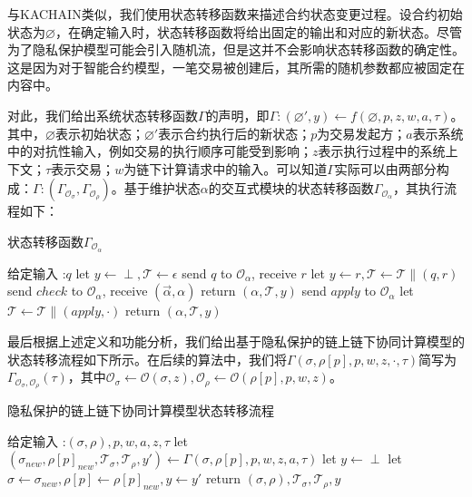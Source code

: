 与KACHAIN\cite{9505181}类似，我们使用状态转移函数来描述合约状态变更过程。设合约初始状态为$\varnothing$，在确定输入时，状态转移函数将给出固定的输出和对应的新状态。尽管为了隐私保护模型可能会引入随机流，但是这并不会影响状态转移函数的确定性。这是因为对于智能合约模型，一笔交易被创建后，其所需的随机参数都应被固定在内容中。

对此，我们给出系统状态转移函数$\Gamma$的声明，即$\Gamma:(\varnothing', y) \leftarrow f(\varnothing, p, z, w, a, \tau)$。其中，$\varnothing$表示初始状态；$\varnothing'$表示合约执行后的新状态；$p$为交易发起方；$a$表示系统中的对抗性输入，例如交易的执行顺序可能受到影响；$z$表示执行过程中的系统上下文；$\tau$表示交易；$w$为链下计算请求中的输入。可以知道$\Gamma$实际可以由两部分构成：$\Gamma: (\Gamma_{\mathcal{O}_\sigma}, \Gamma_{\mathcal{O}_\rho})$。基于维护状态$\alpha$的交互式模块的状态转移函数$\Gamma_{\mathcal{O}_\alpha}$，其执行流程如下：

\begin{breakablealgorithm}
    \caption{状态转移函数$\Gamma_{\mathcal{O}_\alpha}$}
    \label{alg:ch3-3}
    \begin{algorithmic} 
        \item[给定输入]:$q$
        \STATE let $y \leftarrow \perp, \mathcal{T} \leftarrow \epsilon$
        \STATE send $q$ to $\mathcal{O}_\alpha$, receive $r$
        \STATE let $y \leftarrow r, \mathcal{T} \leftarrow \mathcal{T} \parallel (q, r)$
        \STATE send $check$ to $\mathcal{O}_\alpha$, receive $(\vec{\alpha}, \alpha)$
        \STATE return $(\alpha, \mathcal{T}, y)$
        \ENDIF
        \STATE send $apply$ to $\mathcal{O}_\alpha$
        \STATE let $\mathcal{T} \leftarrow \mathcal{T} \parallel (apply, \cdot)$
        \STATE return $(\alpha, \mathcal{T}, y)$
    \end{algorithmic}
\end{breakablealgorithm}

最后根据上述定义和功能分析，我们给出基于隐私保护的链上链下协同计算模型的状态转移流程如下所示。在后续的算法中，我们将$\Gamma(\sigma, \rho[p], p, w, z, \cdot, \tau)$简写为$\Gamma_{\mathcal{O}_\sigma, \mathcal{O}_\rho}(\tau)$，其中$\mathcal{O}_\sigma \leftarrow \mathcal{O}(\sigma, z), \mathcal{O}_\rho \leftarrow \mathcal{O}(\rho[p], p, w, z)$。

\begin{breakablealgorithm}
    \caption{隐私保护的链上链下协同计算模型状态转移流程}
    \label{alg:ch3-4}
    \begin{algorithmic} 
        \setlength{\itemsep}{0pt}
        \setlength{\parsep}{0pt}
        \setlength{\parskip}{0pt}
        \item [给定输入]:$(\sigma, \rho), p, w, a, z, \tau$
        \STATE let $(\sigma_{new}, \rho[p]_{new},\mathcal{T}_\sigma, \mathcal{T}_\rho, y') \leftarrow \Gamma(\sigma, \rho[p], p, w, z, a, \tau)$
        \STATE let $y \leftarrow \perp$
        \STATE let $\sigma \leftarrow \sigma_{new}, \rho[p] \leftarrow \rho[p]_{new}, y \leftarrow y'$
        \STATE return $(\sigma, \rho), \mathcal{T}_\sigma, \mathcal{T}_\rho, y$
    \end{algorithmic}
\end{breakablealgorithm}


